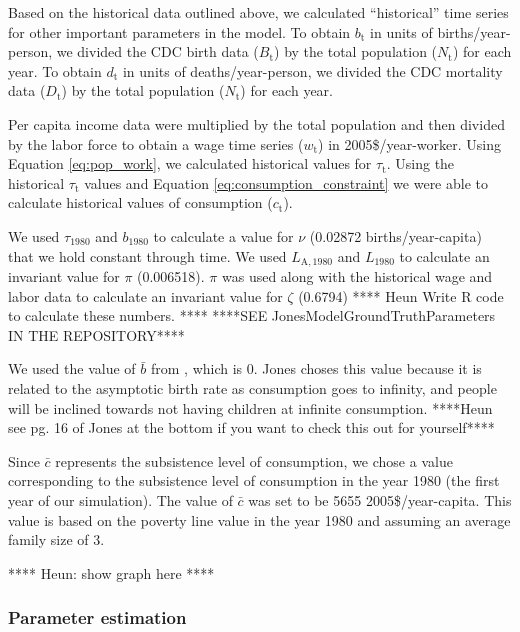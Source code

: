 \documentclass[letterpaper,12pt]{article}
\begin{document}
Based on the historical data outlined above, we calculated ``historical'' time series for other important parameters in the model. To obtain $b_\mathrm{t}$ in units of births/year-person, we divided the CDC birth data ($B_\mathrm{t}$) by the total population ($N_\mathrm{t}$) for each year. To obtain $d_\mathrm{t}$ in units of deaths/year-person, we divided the CDC mortality data ($D_\mathrm{t}$) by the total population ($N_\mathrm{t}$) for each year.

Per capita income data were multiplied by the total population and then divided by the labor force to obtain a wage time series ($w_\mathrm{t}$) in 2005\$/year-worker. Using Equation \ref{eq:pop_work}, we calculated historical values for $\tau_\mathrm{t}$. Using the historical $\tau_\mathrm{t}$ values and Equation \ref{eq:consumption_constraint} we were able to calculate historical values of consumption ($c_\mathrm{t}$). 

We used $\tau_\mathrm{1980}$ and $b_\mathrm{1980}$ to calculate a value for $\nu$ (0.02872 births/year-capita) that we hold constant through time. We used $L_\mathrm{A,1980}$ and $L_{1980}$ to calculate an invariant value for $\pi$ (0.006518). $\pi$ was used along with the historical wage and labor data to calculate an invariant value for $\zeta$ (0.6794) **** Heun Write R code to calculate these numbers. ****
****SEE JonesModelGroundTruthParameters IN THE REPOSITORY****

We used the value of $\bar b$ from \citet{Jones:2001wn}, which is 0. Jones choses this value because it is related to the asymptotic birth rate as consumption goes to infinity, and people will be inclined towards not having children at infinite consumption. ****Heun see pg. 16 of Jones at the bottom if you want to check this out for yourself****

Since $\bar c$ represents the subsistence level of consumption, we chose a value corresponding to the subsistence level of consumption in the year 1980 (the first year of our simulation). The value of $\bar c$ was set to be 5655 2005\$/year-capita. This value is based on the poverty line value in the year 1980 and assuming an average family size of 3.


**** Heun: show graph here ****

\subsubsection{Parameter estimation}
\label{sec:basic_model_parameter_estimation}
\end{document}
